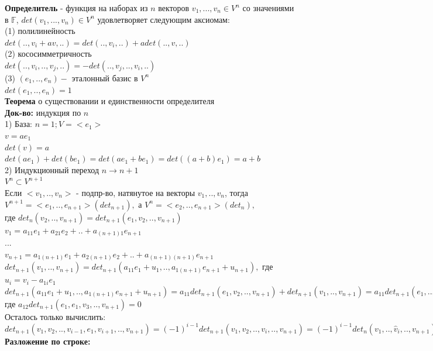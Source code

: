 \documentclass[12pt, oneside]{book}
\theoremstyle{definition}
\begin{document}
\begin{enumerate}
\textbf{Определитель} - функция на наборах из $n$ векторов $v_1, ..., v_n \in V^{n}$ со значениями в $\mathbb{F}$, $det(v_1, ..., v_n) \in V^{n}$ удовлетворяет следующим аксиомам:\\
(1) полилинейность\\
$det(.., v_i+av,..)=det(.., v_i,..)+adet(.., v,..)$\\
(2) кососимметричность\\
$det(.., v_i,..,v_j,..)=-det(..,v_j,..,v_i,..)$\\
(3) $(e_1,..,e_n) -$ эталонный базис в $V^{n}$\\
$det(e_1,..,e_n)=1$\\
\textbf{Теорема} о существовании и единственности определителя\\
\textbf{Док-во:} индукция по $n$\\
1) База: $n=1; V=<e_1>$\\
$v=ae_1$\\
$det(v)=a$\\
$det(ae_1)+det(be_1)=det(ae_1+be_1)=det((a+b)e_1)=a+b$\\
2) Индукционный переход $n \longrightarrow n+1$\\
$V^{n} \subset V^{n+1}$\\
Если $<v_1,..,v_n>$ - подпр-во, натянутое на векторы $v_1,..,v_n$, тогда $V^{n+1}=<e_1,..,e_{n+1}>(det_{n+1}),$ а $V^n=<e_2,..,e_{n+1}>(det_n),$\\
где $det_n(v_2,..,v_{n+1})=det_{n+1}(e_1,v_2,..,v_{n+1})$\\
$v_1=a_{11}e_1+a_{21}e_2+..+a_{(n+1)1}e_{n+1}$\\
$...$\\
$v_{n+1}=a_{1(n+1)}e_1+a_{2(n+1)}e_2+..+a_{(n+1)(n+1)}e_{n+1}$\\
$det_{n+1}(v_1,..,v_{n+1})=det_{n+1}(a_{11}e_1+u_1,..,a_{1(n+1)}e_{n+1}+u_{n+1}),$ где $u_i=v_i-a_{1i}e_1$\\
$det_{n+1}(a_{11}e_1+u_1,..,a_{1(n+1)}e_{n+1}+u_{n+1})=a_{11}det_{n+1}(e_1, v_2,..,v_{n+1})+det_{n+1}(v_1,..,v_{n+1})=a_{11}det_{n+1}(e_1,..,v_{n+1})+a_{12}det_{n+1}(v_1,e_1,..,v_{n+1})+...+a_{1(n+1)}det_{n+1}(v_1,..,e_1)=det_{n+1}(e_1,..,v_{n+1})+a_{12}det_{n+1}(e_1,e_1,v_3,..,v_{n+1}),$ где $a_{12}det_{n+1}(e_1,e_1,v_3,..,v_{n+1})=0$\\
Осталось только вычислить: $det_{n+1}(v_1,v_2,..,v_{i-1},e_1,v_{i+1},..,v_{n+1})=(-1)^{i-1}det_{n+1}(v_1,v_2,..,v_i,..,v_{n+1})=(-1)^{i-1}det_n(v_1,..,\widehat v_i,..,v_{n+1}), \textbf{чтд}$\\
\textbf{Разложение по строке:}\\

\end{enumerate}
\end{document}
